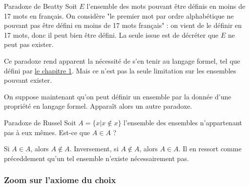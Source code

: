 \begin{boite}{Paradoxe de Beatty}
	Soit $E$ l'ensemble des mots pouvant être définis en moins de 17 mots en français. On considère "le premier mot par ordre alphabétique ne pouvant pas être défini en moins de 17 mots français" : on vient de le définir en 17 mots, donc il peut bien être défini. La seule issue est de décréter que $E$ ne peut pas exister. 
\end{boite}

Ce paradoxe rend apparent la nécessité de s'en tenir au langage formel, tel que défini par \hyperref[lang]{le chapitre 1}. Mais ce n'est pas la seule limitation sur les ensembles pouvant exister.

On suppose maintenant qu'on peut définir un ensemble par la donnée d'une propriété en langage formel. Apparaît alors un autre paradoxe.

\begin{boite}{Paradoxe de Russel}
	Soit $A=\{x|x\not\in x\}$ l'ensemble des ensembles n'appartenant pas à eux mêmes. Est-ce que $A\in A$ ?

	Si $A\in A$, alors $A\not \in A$. Inversement, si $A \not\in A$, alors $A\in A$. Il en ressort comme préceddement qu'un tel ensemble n'existe nécessairement pas. 
\end{boite}



\subsubsection{Zoom sur l'axiome du choix}


